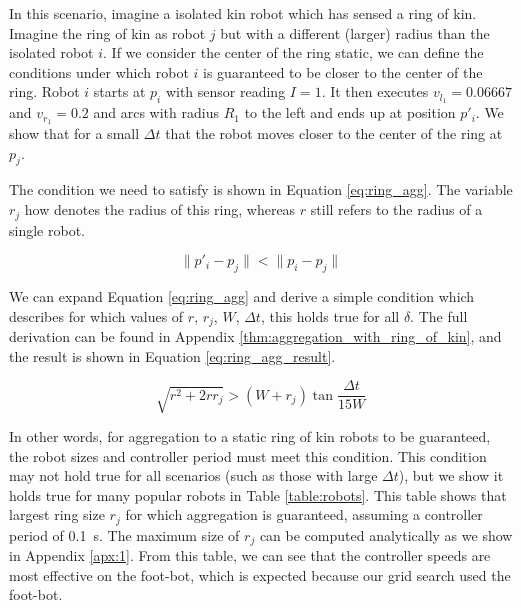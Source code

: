 \documentclass[conference]{IEEEtran}
\begin{document}
      In this scenario, imagine a isolated kin robot which has sensed a ring of kin. Imagine the ring of kin as robot $j$ but with a different (larger) radius than the isolated robot $i$. If we consider the center of the ring static, we can define the conditions under which robot $i$ is guaranteed to be closer to the center of the ring. Robot $i$ starts at $p_i$ with sensor reading $I=1$. It then executes $v_{l_1} = 0.06667$ and $v_{r_1} = 0.2$ and arcs with radius $R_1$ to the left and ends up at position $p'_i$. We show that for a small $\Delta t$ that the robot moves closer to the center of the ring at $p_j$.

      The condition we need to satisfy is shown in Equation \eqref{eq:ring_agg}. The variable $r_j$ how denotes the radius of this ring, whereas $r$ still refers to the radius of a single robot.

      \begin{equation} \label{eq:ring_agg}
        \lVert p'_i - p_j \rVert < \lVert p_i - p_j \rVert
      \end{equation}

      We can expand Equation \eqref{eq:ring_agg} and derive a simple condition which describes for which values of $r$, $r_j$, $W$, $\Delta t$, this holds true for all $\delta$. The full derivation can be found in Appendix \ref{thm:aggregation_with_ring_of_kin}, and the result is shown in Equation \eqref{eq:ring_agg_result}.

      \begin{equation} \label{eq:ring_agg_result}
        \sqrt{r^2 + 2rr_j} > (W+r_j)\tan{\frac{\Delta t}{15W}}
      \end{equation}

      In other words, for aggregation to a static ring of kin robots to be guaranteed, the robot sizes and controller period must meet this condition. This condition may not hold true for all scenarios (such as those with large $\Delta t$), but we show it holds true for many popular robots in Table \ref{table:robots}. This table shows that largest ring size $r_j$ for which aggregation is guaranteed, assuming a controller period of \SI{0.1}{\second}. The maximum size of $r_j$ can be computed analytically as we show in Appendix \ref{apx:1}. From this table, we can see that the controller speeds are most effective on the foot-bot, which is expected because our grid search used the foot-bot.
\end{document}

